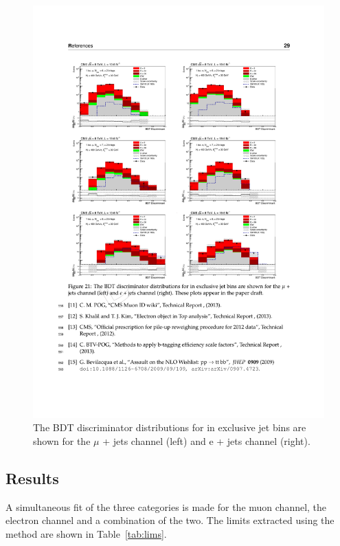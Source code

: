 \begin{figure}
     \includegraphics[width=\textwidth]{images/Run1/BDTjetsplit8TeV.pdf}          
    \caption{The BDT discriminator distributions for in exclusive jet bins are shown for the $\mu$ + jets channel (left) and e + jets channel (right).}
    \label{fig:jetsplitBDT8}
\end{figure}

\subsection{Results}

A simultaneous fit of the three \njets categories is made for the muon channel, the electron channel and a combination of the two. The limits extracted using the \CLS method are shown in Table~\ref{tab:lims}.


